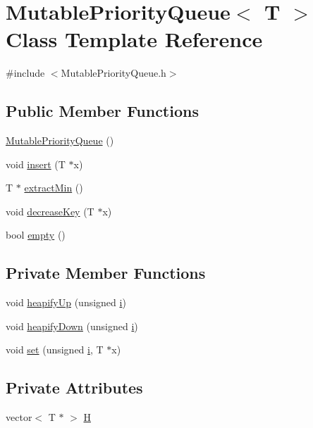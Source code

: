 \hypertarget{classMutablePriorityQueue}{}\section{Mutable\+Priority\+Queue$<$ T $>$ Class Template Reference}
\label{classMutablePriorityQueue}


{\ttfamily \#include $<$Mutable\+Priority\+Queue.\+h$>$}

\subsection*{Public Member Functions}
\begin{DoxyCompactItemize}
\item 
\hyperlink{classMutablePriorityQueue_aba8ebedcbe659f2680bac229cfaca526}{Mutable\+Priority\+Queue} ()
\item 
void \hyperlink{classMutablePriorityQueue_a058fc182052af82e10cc3719e448b62d}{insert} (T $\ast$x)
\item 
T $\ast$ \hyperlink{classMutablePriorityQueue_a3880874d7364279ac0d6d31302b28853}{extract\+Min} ()
\item 
void \hyperlink{classMutablePriorityQueue_a0878839cc1d2dba2b8ab2e589ecc6405}{decrease\+Key} (T $\ast$x)
\item 
bool \hyperlink{classMutablePriorityQueue_a2edbb1f4a6fa3ff735700dfcebebe8d4}{empty} ()
\end{DoxyCompactItemize}
\subsection*{Private Member Functions}
\begin{DoxyCompactItemize}
\item 
void \hyperlink{classMutablePriorityQueue_ae2518c7a1be2bd1e7c633d82dede5450}{heapify\+Up} (unsigned \hyperlink{menu_8cpp_a98862a04b438a5359a542f245ca97b62}{i})
\item 
void \hyperlink{classMutablePriorityQueue_a699bfb6d976cabb01edead4c24284a08}{heapify\+Down} (unsigned \hyperlink{menu_8cpp_a98862a04b438a5359a542f245ca97b62}{i})
\item 
void \hyperlink{classMutablePriorityQueue_afbe461c0a2ea2f16006ed7e1bf9c105d}{set} (unsigned \hyperlink{menu_8cpp_a98862a04b438a5359a542f245ca97b62}{i}, T $\ast$x)
\end{DoxyCompactItemize}
\subsection*{Private Attributes}
\begin{DoxyCompactItemize}
\item 
vector$<$ T $\ast$ $>$ \hyperlink{classMutablePriorityQueue_a2c442cb8e2ff5cfa7562174dadc83fe7}{H}
\end{DoxyCompactItemize}


